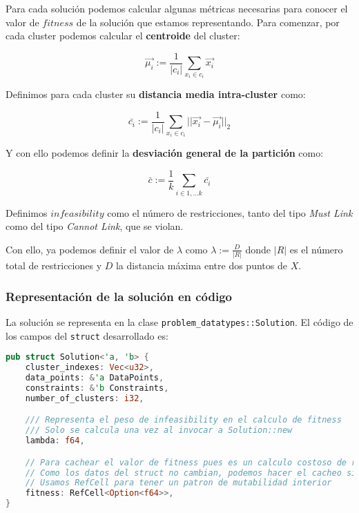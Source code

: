 \documentclass[11pt]{article}
\begin{document}
Para cada solución podemos calcular algunas métricas necesarias para conocer el valor de $fitness$ de la solución que estamos representando. Para comenzar, por cada cluster podemos calcular el \textbf{centroide} del cluster:

\begin{displaymath}
    \vec{\mu_i} := \frac{1}{|c_i|} \sum_{x_i \in c_i} \vec{x_i}
\end{displaymath}

Definimos para cada cluster su \textbf{distancia media intra-cluster} como:

\begin{displaymath}
    \bar{c_i} := \frac{1}{|c_i|} \sum_{x_i \in c_i} || \vec{x_i} - \vec{\mu_i} ||_2
\end{displaymath}

Y con ello podemos definir la \textbf{desviación general de la partición} como:

\begin{displaymath}
    \bar{c} := \frac{1}{k} \sum_{i \in 1, \ldots k} \bar{c_i}
\end{displaymath}

Definimos $infeasibility$ como el número de restricciones, tanto del tipo \emph{Must Link} como del tipo \emph{Cannot Link}, que se violan.

Con ello, ya podemos definir el valor de $\lambda$ como $\lambda := \frac{D}{|R|}$ donde $|R|$ es el número total de restricciones y $D$ la distancia máxima entre dos puntos de $X$.


\subsubsection{Representación de la solución en código}

La solución se representa en la clase \lstinline{problem_datatypes::Solution}. El código de los campos del \lstinline{struct} desarrollado es:

\begin{lstlisting}[language=Rust, style=Boxed]
pub struct Solution<'a, 'b> {
    cluster_indexes: Vec<u32>,
    data_points: &'a DataPoints,
    constraints: &'b Constraints,
    number_of_clusters: i32,

    /// Representa el peso de infeasibility en el calculo de fitness
    /// Solo se calcula una vez al invocar a Solution::new
    lambda: f64,

    // Para cachear el valor de fitness pues es un calculo costoso de realizar
    // Como los datos del struct no cambian, podemos hacer el cacheo sin miedo
    // Usamos RefCell para tener un patron de mutabilidad interior
    fitness: RefCell<Option<f64>>,
}
\end{lstlisting}
\end{document}
